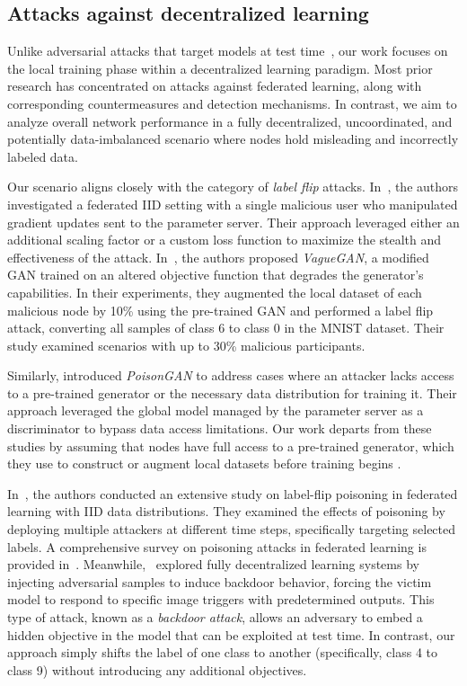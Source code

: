 \subsection{Attacks against decentralized learning}

Unlike adversarial attacks that target models at test time~\cite{tabacof2016exploring}, our work focuses on the local training phase within a decentralized learning paradigm. Most prior research has concentrated on attacks against federated learning, along with corresponding countermeasures and detection mechanisms. In contrast, we aim to analyze overall network performance in a fully decentralized, uncoordinated, and potentially data-imbalanced scenario where nodes hold misleading and incorrectly labeled data.

Our scenario aligns closely with the category of \textit{label flip} attacks. In~\cite{bhagoji2019analyzing}, the authors investigated a federated IID setting with a single malicious user who manipulated gradient updates sent to the parameter server. Their approach leveraged either an additional scaling factor or a custom loss function to maximize the stealth and effectiveness of the attack. In~\cite{sun2024gan}, the authors proposed \textit{VagueGAN}, a modified GAN trained on an altered objective function that degrades the generator’s capabilities. In their experiments, they augmented the local dataset of each malicious node by 10\% using the pre-trained GAN and performed a label flip attack, converting all samples of class 6 to class 0 in the MNIST dataset. Their study examined scenarios with up to 30\% malicious participants.

Similarly, \cite{zhang2020poisongan} introduced \textit{PoisonGAN} to address cases where an attacker lacks access to a pre-trained generator or the necessary data distribution for training it. Their approach leveraged the global model managed by the parameter server as a discriminator to bypass data access limitations. Our work departs from these studies by assuming that nodes have full access to a pre-trained generator, which they use to construct or augment local datasets before training begins . %

In~\cite{tolpegin2020data}, the authors conducted an extensive study on label-flip poisoning in federated learning with IID data distributions. They examined the effects of poisoning by deploying multiple attackers at different time steps, specifically targeting selected labels. A comprehensive survey on poisoning attacks in federated learning is provided in~\cite{xia2023poisoning}. Meanwhile,~\cite{pham2024data} explored fully decentralized learning systems by injecting adversarial samples to induce backdoor behavior, forcing the victim model to respond to specific image triggers with predetermined outputs. This type of attack, known as a \textit{backdoor attack}, allows an adversary to embed a hidden objective in the model that can be exploited at test time. In contrast, our approach simply shifts the label of one class to another (specifically, class 4 to class 9) without introducing any additional objectives.

